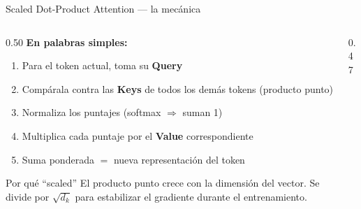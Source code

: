 \documentclass[aspectratio=169, 10pt]{beamer}
\newcommand{\concept}[1]{\textcolor{fenblue}{\textbf{#1}}}
\begin{document}
\begin{frame}{Scaled Dot-Product Attention --- la mecánica}

  \begin{columns}[T]
    \begin{column}{0.50\textwidth}
      \textbf{En palabras simples:}
      \begin{enumerate}
        \item Para el token actual, toma su \concept{Query}
        \item Compárala contra las \concept{Keys} de todos los demás tokens (producto punto)
        \item Normaliza los puntajes (softmax $\Rightarrow$ suman 1)
        \item Multiplica cada puntaje por el \concept{Value} correspondiente
        \item Suma ponderada $=$ nueva representación del token
      \end{enumerate}

      \vspace{0.3em}
      \begin{alertblock}{Por qué ``scaled''}
        El producto punto crece con la dimensión del vector. Se divide por $\sqrt{d_k}$ para estabilizar el gradiente durante el entrenamiento.
      \end{alertblock}
    \end{column}
    \begin{column}{0.47\textwidth}
      \begin{center}
      \end{center}
    \end{column}
  \end{columns}

\end{frame}
\end{document}
